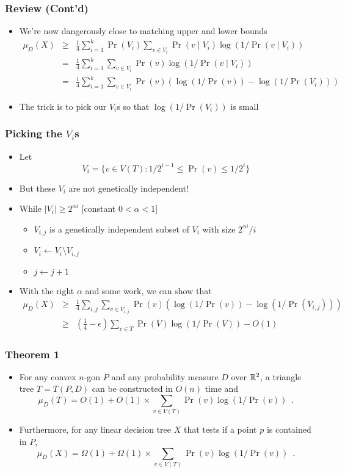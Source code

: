 \documentclass{beamer}
\begin{document}
\frame
{
	\frametitle{Review (Cont'd)}

 	\begin{itemize}
	\item<1-> We're now dangerously close to matching upper and lower bounds
        \begin{eqnarray*}
	\mu_D(X) &\ge &\frac{1}{4}\sum_{i=1}^k
	   \Pr(V_i)\sum_{v\in V_i} \Pr(v\mid V_i)\log(1/\Pr(v\mid V_i)) \\
	& = &\frac{1}{4}\sum_{i=1}^k\sum_{v\in V_i} 
		\Pr(v)\log(1/\Pr(v\mid V_i)) \\
	& = &\frac{1}{4}\sum_{i=1}^k\sum_{v\in V_i} 
		\Pr(v)(\log(1/\Pr(v))-\log(1/\Pr(V_i)))
	\end{eqnarray*}
	\item<2-> The trick is to pick our $V_i$s so that
$\log(1/\Pr(V_i))$ is small
	\end{itemize}

}


\frame
{
	\frametitle{Picking the $V_i$s}

	\begin{itemize}
	\item<1-> Let
	\[
		V_i=\{v\in V(T) :1/2^{i-1} \le \Pr(v) \le 1/2^i \}
	\]
	\item<2-> But these $V_i$ are not genetically independent!
 	\item<3-> While $|V_i|\ge 2^{\alpha i}$  [constant $0< \alpha
< 1$]
	   \begin{itemize}
		\item $V_{i,j}$ is a genetically independent subset of
			$V_i$ with size $2^{\alpha i}/i$
		\item $V_i\gets V_i\setminus V_{i,j}$
		\item $j\gets j+1$
	   \end{itemize}
	\item<4-> With the right $\alpha$ and some work, we can show that
	\begin{eqnarray*}
	\mu_D(X) & \ge & \frac{1}{4}\sum_{i,j}\sum_{v\in V_{i,j}} 
		\Pr(v)(\log(1/\Pr(v))-\log(1/\Pr(V_{i,j}))) \\
	& \ge & \left(\frac{1}{4}-\epsilon\right)\sum_{v\in T}\Pr(V)\log(1/\Pr(V)) -
O(1)
	\end{eqnarray*}
	\end{itemize}
}

\frame
{
	\frametitle{Theorem 1}
	\begin{itemize}
	\item<1-> For any convex $n$-gon $P$ and
any probability measure $D$ over $\mathbb{R}^2$, a triangle tree $T=T(P,D)$ can be
constructed in $O(n)$ time and 
\[
	\mu_D(T) = O(1) + O(1)\times\sum_{v\in V(T)} \Pr(v)\log(1/\Pr(v))
\enspace .
\]

	\item<2-> Furthermore, for any linear decision tree $X$ that
	tests if a point $p$ is contained in $P$,
	\[
	\mu_D(X) = \Omega(1) + \Omega(1)\times\sum_{v\in V(T)}
	\Pr(v)\log(1/\Pr(v)) \enspace .
	\]
	\end{itemize}
}
\end{document}
